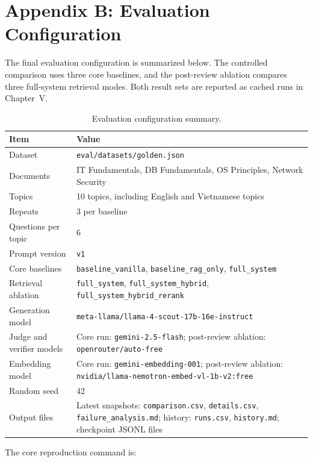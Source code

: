 \documentclass[12pt,a4paper]{article}
\begin{document}
\section*{Appendix B: Evaluation Configuration}

The final evaluation configuration is summarized below. The controlled
comparison uses three core baselines, and the post-review ablation compares
three full-system retrieval modes. Both result sets are reported as cached
runs in Chapter~V.

\begin{longtable}{@{}p{4.0cm}p{9.0cm}@{}}
  \caption{Evaluation configuration summary.}
  \label{tab:appendix-eval-config}\\
  \toprule
  \textbf{Item} & \textbf{Value} \\
  \midrule
  Dataset & \texttt{eval/datasets/golden.json} \\
  Documents & IT Fundamentals, DB Fundamentals, OS Principles, Network Security \\
  Topics & 10 topics, including English and Vietnamese topics \\
  Repeats & 3 per baseline \\
  Questions per topic & 6 \\
  Prompt version & \texttt{v1} \\
  Core baselines & \texttt{baseline\_vanilla}, \texttt{baseline\_rag\_only}, \texttt{full\_system} \\
  Retrieval ablation & \texttt{full\_system}, \texttt{full\_system\_hybrid}, \texttt{full\_system\_hybrid\_rerank} \\
  Generation model & \texttt{meta-llama/llama-4-scout-17b-16e-instruct} \\
  Judge and verifier models & Core run: \texttt{gemini-2.5-flash}; post-review ablation: \texttt{openrouter/auto-free} \\
  Embedding model & Core run: \texttt{gemini-embedding-001}; post-review ablation: \texttt{nvidia/llama-nemotron-embed-vl-1b-v2:free} \\
  Random seed & 42 \\
  Output files & Latest snapshots: \texttt{comparison.csv}, \texttt{details.csv}, \texttt{failure\_analysis.md}; history: \texttt{runs.csv}, \texttt{history.md}; checkpoint JSONL files \\
  \bottomrule
\end{longtable}

The core reproduction command is:
\end{document}
